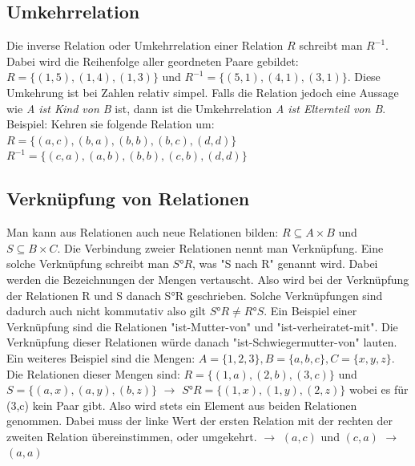 \documentclass{article}
\begin{document}
	 \subsection{Umkehrrelation}
	 Die inverse Relation oder Umkehrrelation einer Relation $R$ schreibt man $R^{-1}$. Dabei wird die Reihenfolge aller geordneten Paare gebildet: $R=\{(1,5),(1,4),(1,3)\}$ und $R^{-1}=\{(5,1),(4,1),(3,1)\}$. Diese Umkehrung ist bei Zahlen relativ simpel. Falls die Relation jedoch eine Aussage wie \textit{A ist Kind von B} ist, dann ist die Umkehrrelation \textit{A ist Elternteil von B}. \\
	 Beispiel: Kehren sie folgende Relation um:
	 $R=\{(a,c),(b,a),(b,b),(b,c),(d,d)\}\ $\to$ R^{-1} = \{(c,a),(a,b),(b,b),(c,b),(d,d)\}$ \\
	 \subsection{Verknüpfung von Relationen}
	 Man kann aus Relationen auch neue Relationen bilden: $R\subseteq A\times B$ und $S\subseteq B\times C$. Die Verbindung zweier Relationen nennt man Verknüpfung. Eine solche Verknüpfung schreibt man $S°R$, was "S nach R" genannt wird. Dabei werden die Bezeichnungen der Mengen vertauscht. Also wird bei der Verknüpfung der Relationen R und S danach S°R geschrieben. Solche Verknüpfungen sind dadurch auch nicht kommutativ also gilt $S°R \neq R°S$. Ein Beispiel einer Verknüpfung sind die Relationen "ist-Mutter-von" und "ist-verheiratet-mit". Die Verknüpfung dieser Relationen würde danach "ist-Schwiegermutter-von" lauten. \\
	 Ein weiteres Beispiel sind die Mengen: $A=\{1,2,3\}, B=\{a,b,c\}, C=\{x,y,z\}$. Die Relationen dieser Mengen sind: $R=\{(1,a),(2,b),(3,c)\}$ und $S=\{(a,x),(a,y),(b,z)\}$ $\to$ $S°R=\{(1,x),(1,y),(2,z)\}$ wobei es für (3,c) kein Paar gibt. Also wird stets ein Element aus beiden Relationen genommen. Dabei muss der linke Wert der ersten Relation mit der rechten der zweiten Relation übereinstimmen, oder umgekehrt. $\to$ $(a,c)$ und $(c,a)$ $\to$ $(a,a)$ 
\end{document}

